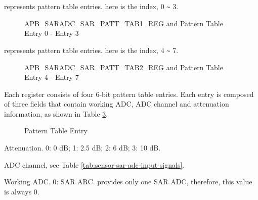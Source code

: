 \documentclass[main\_\_EN.tex]{subfiles}
\begin{document}
%
%
%
%
%
\begin{regdesc}\begin{reglist}
\item [cmd \regindex{x}] represents pattern table entries.  here is the index, 0 \verb+~+ 3.
\end{reglist}\end{regdesc}
\vspace{-2em}
\begin{figure}[H]
    \centering
    \caption{APB\_SARADC\_SAR\_PATT\_TAB1\_REG and Pattern Table Entry 0 - Entry 3}
    \label{fig:pattern-tab-1}
\end{figure}

%
%
%
%
%
\begin{regdesc}\begin{reglist}
\item [cmd \regindex{x}] represents pattern table entries.  here is the index, 4 \verb+~+ 7.
\end{reglist}\end{regdesc}
\vspace{-2em}
\begin{figure}[H]
    \centering
    \caption{APB\_SARADC\_SAR\_PATT\_TAB2\_REG and Pattern Table Entry 4 - Entry 7}
    \label{fig:pattern-tab-2}
\end{figure}

Each register consists of four 6-bit pattern table entries. Each entry is composed of three fields that contain working ADC, ADC channel and attenuation information, as shown in Table  \ref{fig:sensor-pattern-table-entry}.


\begin{figure}[H]
\centering
{}%
%
%
\end{figure}
\vspace{-2em}
\begin{figure}[H]
    \centering
    \caption{Pattern Table Entry}
    \label{fig:sensor-pattern-table-entry}
\end{figure}
\vspace{-2em}
\begin{regdesc}\begin{reglist}
\item [atten] Attenuation. 0: 0 dB; 1: 2.5 dB; 2: 6 dB; 3: 10 dB.
\item [ch\_sel] ADC channel, see Table \ref{tab:sensor-sar-adc-input-signals}.
\item [sar\_sel] Working ADC. 0: SAR ARC. \chipname{} provides only one SAR ADC, therefore, this value is always 0.
\end{reglist}\end{regdesc}
\end{document}
